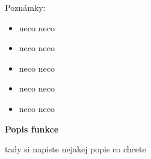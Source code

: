 \documentclass[11pt,a4paper]{article}
\begin{document}
\bigskip

Poznámky:

\begin{itemize}
\setlength\itemsep{-1mm}
    \item \quad neco neco
    \item \quad neco neco
    \item \quad neco neco
    \item \quad neco neco
    \item \quad neco neco
\end{itemize}

\bigskip

\large \textbf{\color{violet}Popis funkce}

\bigskip

tady si napiste
nejakej popis
co chcete
\end{document}
